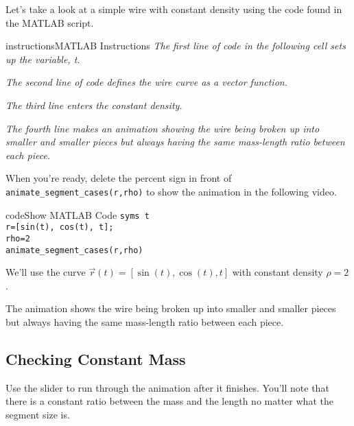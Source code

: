 \documentclass{ximera}
\begin{document}
Let's take a look at a simple wire with constant density using the code found in the MATLAB script.

\begin{expandable}{instructions}{MATLAB Instructions}
\textit{The first line of code in the following cell sets up the variable, t.}

\textit{The second line of code defines the wire curve as a vector function.}

\textit{The third line enters the constant density.}

\textit{The fourth line makes an animation showing the wire being broken up into smaller and smaller pieces but always having the same mass-length ratio between each piece.}

\end{expandable}

When you're ready, delete the percent sign in front of \texttt{animate\_segment\_cases(r,rho)} to show the animation in the following video.

\begin{expandable}{code}{Show MATLAB Code}
\texttt{syms t}\\
\texttt{r=[sin(t), cos(t), t];}\\
\texttt{rho=2}\\
\texttt{animate\_segment\_cases(r,rho)}
\end{expandable}

We'll use the curve $\vec{r}(t) = [\sin(t), \cos(t), t]$ with constant density $\rho = 2$.


The animation shows the wire being broken up into smaller and smaller pieces but always having the same mass-length ratio between each piece.

\subsection*{Checking Constant Mass}

Use the slider to run through the animation after it finishes. You'll note that there is a constant ratio between the mass and the length no matter what the segment size is.
\end{document}
